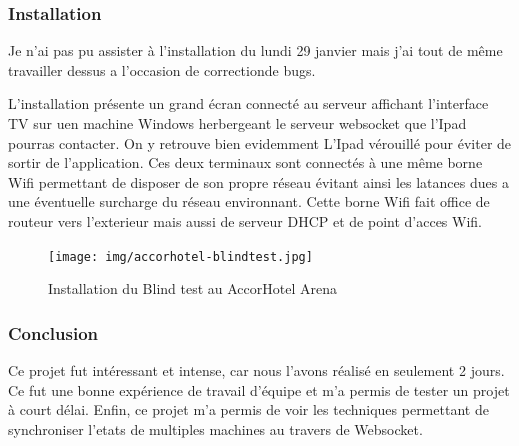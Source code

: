 \subsubsection{Installation}

Je n'ai pas pu assister à l'installation du lundi 29 janvier mais j'ai tout de même travailler dessus a l'occasion de correctionde bugs.

L'installation présente un grand écran connecté au serveur affichant l'interface TV sur uen machine Windows herbergeant le serveur websocket que l'Ipad pourras contacter.
On y retrouve bien evidemment L'Ipad vérouillé pour éviter de sortir de l'application.
Ces deux terminaux sont connectés à une même borne Wifi permettant de disposer de son propre réseau évitant ainsi les latances dues a une éventuelle surcharge du réseau environnant.
Cette borne Wifi fait office de routeur vers l'exterieur mais aussi de serveur DHCP et de point d'acces Wifi.

\begin{figure}[h]
    \centering
    \texttt{[image: img/accorhotel-blindtest.jpg]}
    \caption{Installation du Blind test au AccorHotel Arena}
\end{figure}

\subsubsection{Conclusion}

Ce projet fut intéressant et intense, car nous l'avons réalisé en seulement 2 jours.
Ce fut une bonne expérience de travail d'équipe et m'a permis de tester un projet à court délai.
Enfin, ce projet m'a permis de voir les techniques permettant de synchroniser l'etats de multiples machines au travers de Websocket.